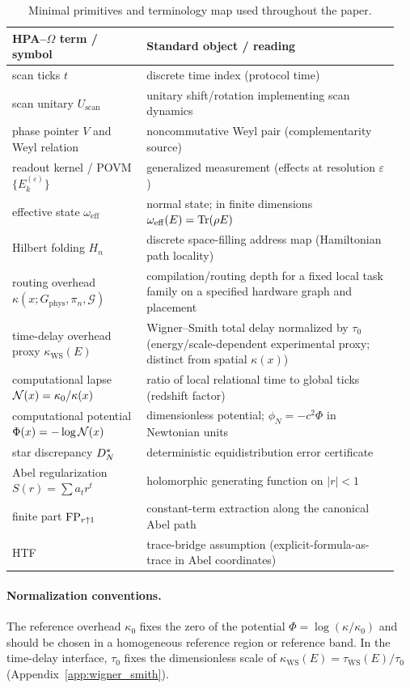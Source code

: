 \begin{table}[t]
\centering
\small
\begin{tabular}{@{}>{\raggedright\arraybackslash}p{0.33\linewidth}>{\raggedright\arraybackslash}p{0.62\linewidth}@{}}
\toprule
HPA--$\Omega$ term / symbol & Standard object / reading \\
\midrule
scan ticks $t$ & discrete time index (protocol time) \\
scan unitary $U_{\mathrm{scan}}$ & unitary shift/rotation implementing scan dynamics \\
phase pointer $V$ and Weyl relation & noncommutative Weyl pair (complementarity source) \\
readout kernel / POVM $\{E_k^{(\varepsilon)}\}$ & generalized measurement (effects at resolution $\varepsilon$) \\
effective state $\omega_{\mathrm{eff}}$ & normal state; in finite dimensions $\omega_{\mathrm{eff}}(E)=\mathrm{Tr}(\rho E)$ \\
Hilbert folding $H_n$ & discrete space-filling address map (Hamiltonian path locality) \\
routing overhead $\kappa(x;G_{\mathrm{phys}},\pi_n,\mathcal{G})$ & compilation/routing depth for a fixed local task family on a specified hardware graph and placement \\
time-delay overhead proxy $\kappa_{\mathrm{WS}}(E)$ & Wigner--Smith total delay normalized by $\tau_0$ (energy/scale-dependent experimental proxy; distinct from spatial $\kappa(x)$) \\
computational lapse $\mathcal{N}(x)=\kappa_0/\kappa(x)$ & ratio of local relational time to global ticks (redshift factor) \\
computational potential $\Phi(x)=-\log\mathcal{N}(x)$ & dimensionless potential; $\phi_N=-c^2\Phi$ in Newtonian units \\
star discrepancy $D_N^\ast$ & deterministic equidistribution error certificate \\
Abel regularization $S(r)=\sum a_t r^t$ & holomorphic generating function on $|r|<1$ \\
finite part $\mathrm{FP}_{r\uparrow 1}$ & constant-term extraction along the canonical Abel path \\
HTF & trace-bridge assumption (explicit-formula-as-trace in Abel coordinates) \\
\bottomrule
\end{tabular}
\caption{Minimal primitives and terminology map used throughout the paper.}
\label{tab:primitives_glossary}
\end{table}

\paragraph{Normalization conventions.}
The reference overhead $\kappa_0$ fixes the zero of the potential $\Phi=\log(\kappa/\kappa_0)$ and should be chosen in a homogeneous reference region or reference band.
In the time-delay interface, $\tau_0$ fixes the dimensionless scale of $\kappa_{\mathrm{WS}}(E)=\tau_{\mathrm{WS}}(E)/\tau_0$ (Appendix~\ref{app:wigner_smith}).


